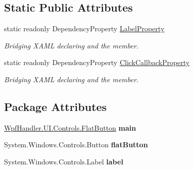 \subsection*{Static Public Attributes}
\begin{DoxyCompactItemize}
\item 
static readonly Dependency\+Property \mbox{\hyperlink{class_wpf_handler_1_1_u_i_1_1_controls_1_1_flat_button_acad3d234805ceee99eeced499fe8cd80}{Label\+Property}}
\begin{DoxyCompactList}\small\item\em Bridging X\+A\+ML declaring and the member. \end{DoxyCompactList}\item 
static readonly Dependency\+Property \mbox{\hyperlink{class_wpf_handler_1_1_u_i_1_1_controls_1_1_flat_button_a1b00c5705a924fc737e20b3af96d7c56}{Click\+Callback\+Property}}
\begin{DoxyCompactList}\small\item\em Bridging X\+A\+ML declaring and the member. \end{DoxyCompactList}\end{DoxyCompactItemize}
\subsection*{Package Attributes}
\begin{DoxyCompactItemize}
\item 
\mbox{\label{class_wpf_handler_1_1_u_i_1_1_controls_1_1_flat_button_a26e3853965c8e0f9bc10fe25d4ad54f2}} 
\mbox{\hyperlink{class_wpf_handler_1_1_u_i_1_1_controls_1_1_flat_button}{Wpf\+Handler.\+U\+I.\+Controls.\+Flat\+Button}} {\bfseries main}
\item 
\mbox{\label{class_wpf_handler_1_1_u_i_1_1_controls_1_1_flat_button_abd241b6a495c587914bde27d925e5fb7}} 
System.\+Windows.\+Controls.\+Button {\bfseries flat\+Button}
\item 
\mbox{\label{class_wpf_handler_1_1_u_i_1_1_controls_1_1_flat_button_a40d13fb4b546b97391efb5ae45b621b7}} 
System.\+Windows.\+Controls.\+Label {\bfseries label}
\end{DoxyCompactItemize}
